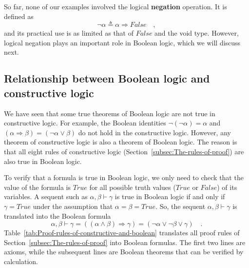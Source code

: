 So far, none of our examples involved the logical \textbf{negation}
operation. It is defined as 
\[
\neg\alpha\triangleq\alpha\Rightarrow False\quad,
\]
and its practical use is as limited as that of $False$ and the void
type. However, logical negation plays an important role in Boolean
logic, which we will discuss next.

\subsection{Relationship between Boolean logic and constructive logic\label{subsec:Relationship-between-Boolean} }

We have seen that some true theorems of Boolean logic are not true
in constructive logic. For example, the Boolean identities $\neg\left(\neg\alpha\right)=\alpha$
and $\left(\alpha\Rightarrow\beta\right)=(\neg\alpha\vee\beta)$ do
not hold in the constructive logic. However, any theorem of constructive
logic is also a theorem of Boolean logic. The reason is that all eight
rules of constructive logic (Section~\ref{subsec:The-rules-of-proof})
are also true in Boolean logic.

To verify that a formula is true in Boolean logic, we only need to
check that the value of the formula is $True$ for all possible truth
values ($True$ or $False$) of its variables. A sequent such as $\alpha,\beta\vdash\gamma$
is true in Boolean logic if and only if $\gamma=True$ under the assumption
that $\alpha=\beta=True$. So, the sequent $\alpha,\beta\vdash\gamma$
is translated into the Boolean formula 
\[
\alpha,\beta\vdash\gamma=\left(\left(\alpha\wedge\beta\right)\Rightarrow\gamma\right)=\left(\neg\alpha\vee\neg\beta\vee\gamma\right)\quad.
\]
Table~\ref{tab:Proof-rules-of-constructive-and-boolean} translates
all proof rules of Section~\ref{subsec:The-rules-of-proof} into
Boolean formulas. The first two lines are axioms, while the subsequent
lines are Boolean theorems that can be verified by calculation.

